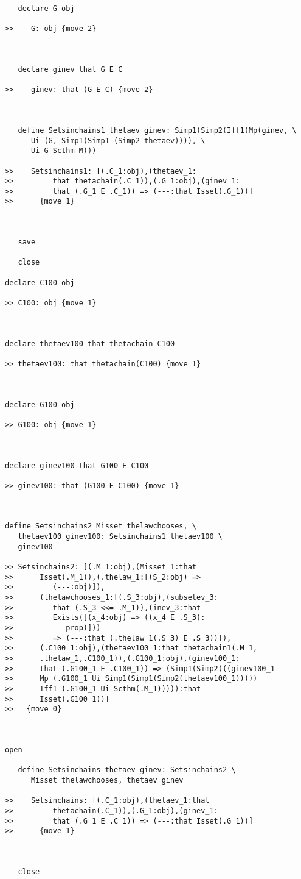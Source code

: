 \documentclass[12pt]{article}
\begin{document}
\begin{verbatim}
   declare G obj

>>    G: obj {move 2}



   declare ginev that G E C

>>    ginev: that (G E C) {move 2}



   define Setsinchains1 thetaev ginev: Simp1(Simp2(Iff1(Mp(ginev, \
      Ui (G, Simp1(Simp1 (Simp2 thetaev)))), \
      Ui G Scthm M)))

>>    Setsinchains1: [(.C_1:obj),(thetaev_1:
>>         that thetachain(.C_1)),(.G_1:obj),(ginev_1:
>>         that (.G_1 E .C_1)) => (---:that Isset(.G_1))]
>>      {move 1}



   save

   close

declare C100 obj

>> C100: obj {move 1}



declare thetaev100 that thetachain C100

>> thetaev100: that thetachain(C100) {move 1}



declare G100 obj

>> G100: obj {move 1}



declare ginev100 that G100 E C100

>> ginev100: that (G100 E C100) {move 1}



define Setsinchains2 Misset thelawchooses, \
   thetaev100 ginev100: Setsinchains1 thetaev100 \
   ginev100

>> Setsinchains2: [(.M_1:obj),(Misset_1:that
>>      Isset(.M_1)),(.thelaw_1:[(S_2:obj) =>
>>         (---:obj)]),
>>      (thelawchooses_1:[(.S_3:obj),(subsetev_3:
>>         that (.S_3 <<= .M_1)),(inev_3:that
>>         Exists([(x_4:obj) => ((x_4 E .S_3):
>>            prop)]))
>>         => (---:that (.thelaw_1(.S_3) E .S_3))]),
>>      (.C100_1:obj),(thetaev100_1:that thetachain1(.M_1,
>>      .thelaw_1,.C100_1)),(.G100_1:obj),(ginev100_1:
>>      that (.G100_1 E .C100_1)) => (Simp1(Simp2(((ginev100_1
>>      Mp (.G100_1 Ui Simp1(Simp1(Simp2(thetaev100_1)))))
>>      Iff1 (.G100_1 Ui Scthm(.M_1))))):that
>>      Isset(.G100_1))]
>>   {move 0}



open

   define Setsinchains thetaev ginev: Setsinchains2 \
      Misset thelawchooses, thetaev ginev

>>    Setsinchains: [(.C_1:obj),(thetaev_1:that
>>         thetachain(.C_1)),(.G_1:obj),(ginev_1:
>>         that (.G_1 E .C_1)) => (---:that Isset(.G_1))]
>>      {move 1}



   close
\end{verbatim}
\end{document}

